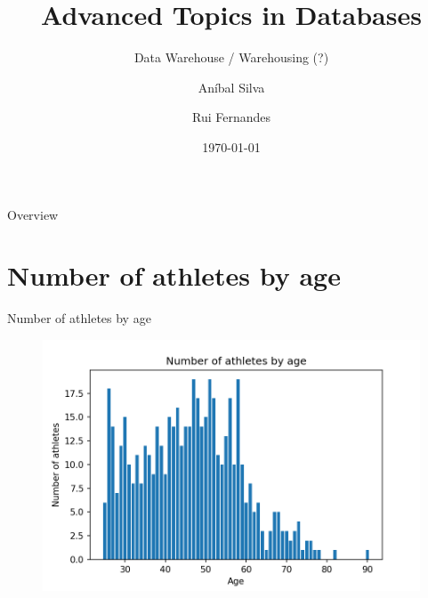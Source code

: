 \documentclass[aspectratio=169,xcolor=dvipsnames]{beamer}
\title[short title]{Advanced Topics in Databases}
\subtitle{Data Warehouse / Warehousing (?)}
\author{Aníbal Silva \and Rui Fernandes}
\date{\today}
\begin{document}
\renewcommand{\today}{\ifcase \month\or January\or February\or March\or %
April\or May\or June\or July\or August\or September\or October\or November\or %
December\fi, \number \year}

\begin{frame}
    \titlepage
\end{frame}

\begin{frame}{Overview}
    \tableofcontents
\end{frame}

\section{Number of athletes by age}
\begin{frame}{Number of athletes by age}
    \begin{figure}[H]
        \centering
        \includegraphics[width=.7\textwidth]{img/athletesbyage.png}
    \end{figure}
\end{frame}
\end{document}
